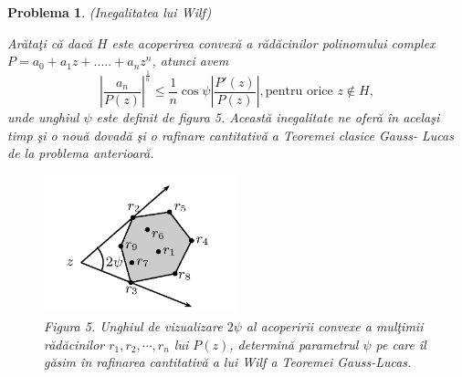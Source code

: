 \documentclass[a4paper,12pt,oneside]{report}
\newtheorem{problem}{Problema}
\begin{document}
\begin{problem} (Inegalitatea lui Wilf)

Ar\u{a}ta\c{t}i c\u{a} dac\u{a} \(H\) este acoperirea convex\u{a} a r\u{a}d\u{a}cinilor polinomului complex \(P = a_{0} + a_{1}z + ..... +a_{n}z^{n}\), atunci avem
\begin{displaymath}
  \left | \frac{a_{n}}{P\left ( z \right )} \right |^{\frac{1}{n}}\leq \frac{1}n\cos{\psi }\left | \frac{{P}'\left ( z \right )}{P\left ( z \right )} \right | , \text{pentru orice } z\notin H, \label{eq:2.16} \tag{2.16}
\end{displaymath}
unde unghiul \(\psi\) este definit de figura 5. Aceast\u{a} inegalitate ne ofer\u{a} \^{i}n acela\c{s}i timp \c{s}i o nou\u{a} dovad\u{a} \c{s}i o rafinare cantitativ\u{a}  a Teoremei clasice Gauss- Lucas de la problema anterioar\u{a}.

\begin{figure}[htbp]
	\centering
	\includegraphics[width=0.5\textwidth]{fig_pb14.png}
	\caption{Figura 5. Unghiul de vizualizare \(2\psi\) al acoperirii convexe a mul\c{t}imii r\u{a}d\u{a}cinilor \(r_{1} , r_{2} , \cdots, r_{n}\)  lui \(P\left ( z \right )\), determin\u{a} parametrul \(\psi\) pe care \^{i}l g\u{a}sim \^{i}n rafinarea cantitativ\u{a} a lui Wilf a Teoremei Gauss-Lucas.}
\end{figure}

\end{problem}
\end{document}
